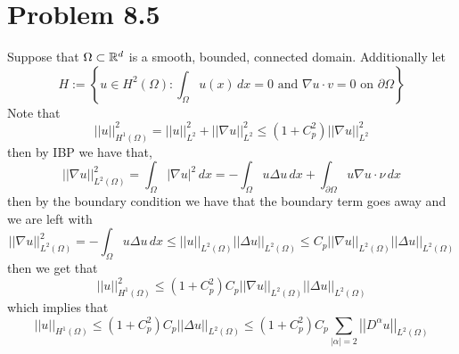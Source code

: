 \documentclass[12pt]{report}
\newcommand{\norm}[1]{\left|\left|#1\right|\right|}
\begin{document}
\section*{Problem 8.5}
Suppose that $\Omega \subset \mathbb{R}^d$ is a smooth, bounded, connected domain. Additionally let 
\begin{equation*}
  H := \left\{ u \in H^2(\Omega) : \int_{\Omega} u(x) \,dx = 0 \text{ and } \nabla u \cdot v = 0 \text{ on } \partial \Omega \right\}
\end{equation*}
Note that
\begin{equation*}
\norm{u}_{H^1(\Omega)}^2 = \norm{u}_{L^2}^2 + \norm{\nabla u}_{L^2}^2 \leq (1 + C_p^2) \norm{\nabla u}_{L^2}^2  
\end{equation*}
then by IBP we have that,
\begin{equation*}
  \norm{\nabla u}_{L^2(\Omega)}^2 = \int_{\Omega} |\nabla u|^2 \,dx = -\int_{\Omega} u \Delta u \, dx + \int_{\partial \Omega} u \nabla u \cdot \nu \, dx
\end{equation*}
then by the boundary condition we have that the boundary term goes away and we are left with
\begin{equation*}
  \norm{\nabla u}_{L^2(\Omega)}^2 = -\int_{\Omega} u \Delta u \, dx \leq \norm{u}_{L^2(\Omega)} \norm{\Delta u}_{L^2(\Omega)} \leq C_p \norm{\nabla u}_{L^2(\Omega)} \norm{\Delta u}_{L^2(\Omega)}
\end{equation*}
then we get that
\begin{equation*}
  \norm{u}_{H^1(\Omega)}^2 \leq (1 + C_p^2)C_p \norm{\nabla u}_{L^2(\Omega)} \norm{\Delta u}_{L^2(\Omega)}
\end{equation*}
which implies that
\begin{equation*}
  \norm{u}_{H^1(\Omega)} \leq (1 + C_p^2)C_p \norm{\Delta u}_{L^2(\Omega)} \leq (1 + C_p^2)C_p \sum_{|\alpha| = 2} \norm{D^\alpha u}_{L^2(\Omega)} 
\end{equation*}
\end{document}
